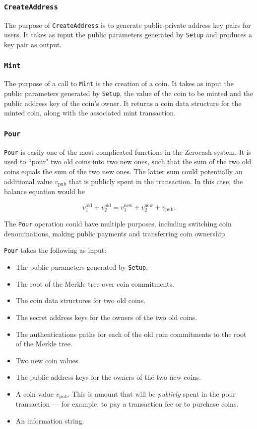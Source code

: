 \documentclass{article}
\begin{document}
\subsubsection{\texttt{CreateAddress}}
The purpose of \texttt{CreateAddress} is to generate public-private address key pairs for users. It takes as input the public parameters generated by \texttt{Setup} and produces a key pair as output.

\subsubsection{\texttt{Mint}}
The purpose of a call to \texttt{Mint} is the creation of a coin. It takes as input the public parameters generated by \texttt{Setup}, the value of the coin to be minted and the public address key of the coin's owner. It returns a coin data structure for the minted coin, along with the associated mint transaction.

\subsubsection{\texttt{Pour}}
\texttt{Pour} is easily one of the most complicated functions in the Zerocash system. It is used to ``pour" two old coins into two new ones, such that the sum of the two old coins equals the sum of the two new ones. The latter sum could potentially an additional value $v_{\text{pub}}$ that is publicly spent in the transaction. In this case, the balance equation would be 

\begin{equation}
v_1^{\text{old}} + v_2^{\text{old}} = v_1^{\text{new}} + v_2^{\text{new}} + v_{\text{pub}}.
\label{balance}
\end{equation}
\newline

The \texttt{Pour} operation could have multiple purposes, including switching coin denominations, making public payments and transferring coin ownership.

\texttt{Pour} takes the following as input:

\begin{itemize}
\item The public parameters generated by \texttt{Setup}.
\item The root of the Merkle tree over coin commitments.
\item The coin data structures for two old coins.
\item The secret address keys for the owners of the two old coins.
\item The authentications paths for each of the old coin commitments to the root of the Merkle tree.
\item Two new coin values.
\item The public address keys for the owners of the two new coins.
\item A coin value $v_\text{pub}$. This is amount that will be \emph{publicly} spent in the pour transaction --- for example, to pay a transaction fee or to purchase coins.
\item An information string.
\end{itemize}
\end{document}
